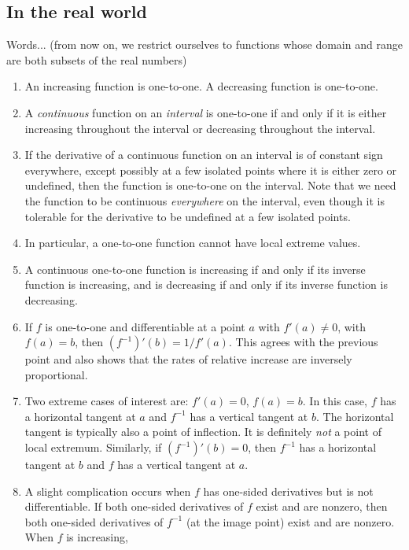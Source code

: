 \documentclass[10pt]{amsart}
\begin{document}
\subsection{In the real world}

Words... (from now on, we restrict ourselves to functions whose domain
and range are both subsets of the real numbers)

\begin{enumerate}

\item An increasing function is one-to-one. A decreasing function is
  one-to-one.
\item A {\em continuous} function on an {\em interval} is one-to-one
  if and only if it is either increasing throughout the interval or
  decreasing throughout the interval.
\item If the derivative of a continuous function on an interval is of
  constant sign everywhere, except possibly at a few isolated points
  where it is either zero or undefined, then the function is
  one-to-one on the interval. Note that we need the function to be
  continuous {\em everywhere} on the interval, even though it is
  tolerable for the derivative to be undefined at a few isolated
  points.
\item In particular, a one-to-one function cannot have local extreme
  values.
\item A continuous one-to-one function is increasing if and only if
  its inverse function is increasing, and is decreasing if and only if
  its inverse function is decreasing.
\item If $f$ is one-to-one and differentiable at a point $a$ with
  $f'(a) \ne 0$, with $f(a) = b$, then $(f^{-1})'(b) = 1/f'(a)$. This
  agrees with the previous point and also shows that the rates of
  relative increase are inversely proportional.
\item Two extreme cases of interest are: $f'(a) = 0$, $f(a) = b$. In
  this case, $f$ has a horizontal tangent at $a$ and $f^{-1}$ has a
  vertical tangent at $b$. The horizontal tangent is typically also a
  point of inflection. It is definitely {\em not} a point of local
  extremum. Similarly, if $(f^{-1})'(b) = 0$, then $f^{-1}$ has a
  horizontal tangent at $b$ and $f$ has a vertical tangent at $a$.
\item A slight complication occurs when $f$ has one-sided derivatives
  but is not differentiable. If both one-sided derivatives of $f$
  exist and are nonzero, then both one-sided derivatives of $f^{-1}$
  (at the image point) exist and are nonzero. When $f$ is increasing,

\end{enumerate}
\end{document}
